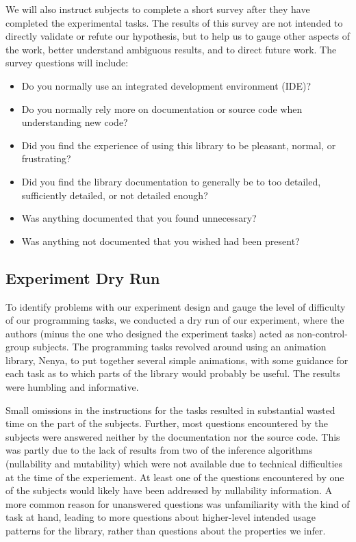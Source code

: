 We will also instruct subjects to complete a short survey after they have
completed the experimental tasks. The results of this survey are not intended
to directly validate or refute our hypothesis, but to help us to gauge other
aspects of the work, better understand ambiguous results, and to direct future
work. The survey questions will include:

\begin{itemize}
\item Do you normally use an integrated development environment (IDE)?
\item Do you normally rely more on documentation or source code when
  understanding new code?
\item Did you find the experience of using this library to be pleasant, normal,
  or frustrating?
\item Did you find the library documentation to generally be to too detailed,
  sufficiently detailed, or not detailed enough?
\item Was anything documented that you found unnecessary?
\item Was anything not documented that you wished had been present?
\end{itemize}

\subsection{Experiment Dry Run}

To identify problems with our experiment design and gauge the level of
difficulty of our programming tasks, we conducted a dry run of our experiment,
where the authors (minus the one who designed the experiment tasks) acted as
non-control-group subjects. 
The programming tasks revolved around using an animation library, Nenya, to put
together several simple animations, with some guidance for each task as to which
parts of the library would probably be useful.
The results were humbling and informative.

Small omissions in the instructions for the tasks resulted in substantial
wasted time on the part of the subjects. Further, most questions encountered by
the subjects were answered neither by the documentation nor the
source code. This was partly due to the lack of results from two of the
inference algorithms (nullability and mutability) which were not available due
to technical difficulties at the time of the experiement. At least one of the
questions encountered by one of the subjects would likely have been addressed
by nullability information.  A more common reason for unanswered questions was
unfamiliarity with the kind of task at hand, leading to more questions about
higher-level intended usage patterns for the library, rather than questions about the
properties we infer.


